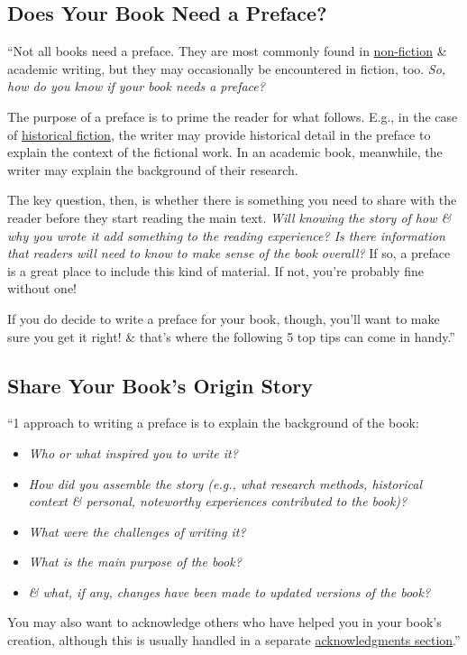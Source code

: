 \documentclass[oneside]{book}
\numberwithin{equation}{section}
\begin{document}
\subsection*{Does Your Book Need a Preface?}
``Not all books need a preface. They are most commonly found in \href{https://en.wikipedia.org/wiki/Nonfiction}{non-fiction} \& academic writing, but they may occasionally be encountered in fiction, too. \textit{So, how do you know if your book needs a preface?}

The purpose of a preface is to prime the reader for what follows. E.g., in the case of \href{https://en.wikipedia.org/wiki/Historical_fiction}{historical fiction}, the writer may provide historical detail in the preface to explain the context of the fictional work. In an academic book, meanwhile, the writer may explain the background of their research.

The key question, then, is whether there is something you need to share with the reader before they start reading the main text. \textit{Will knowing the story of how \& why you wrote it add something to the reading experience? Is there information that readers will need to know to make sense of the book overall?} If so, a preface is a great place to include this kind of material. If not, you're probably fine without one!

If you do decide to write a preface for your book, though, you'll want to make sure you get it right! \& that's where the following 5 top tips can come in handy.''

\subsection{Share Your Book's Origin Story}
``1 approach to writing a preface is to explain the background of the book:
\begin{itemize}
	\item \textit{Who or what inspired you to write it?}
	\item \textit{How did you assemble the story (e.g., what research methods, historical context \& personal, noteworthy experiences contributed to the book)?}
	\item \textit{What were the challenges of writing it?}
	\item \textit{What is the main purpose of the book?}
	\item \textit{\& what, if any, changes have been made to updated versions of the book?}
\end{itemize}
You may also want to acknowledge others who have helped you in your book's creation, although this is usually handled in a separate \href{https://www.linkedin.com/pulse/write-your-book-acknowledgments-without-stressing-over-tucker-max/}{acknowledgments section}.''
\end{document}
